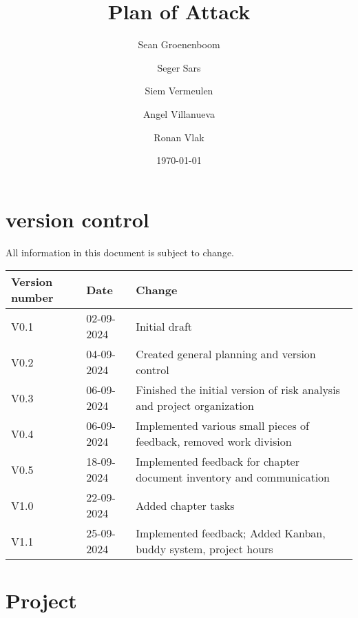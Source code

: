 \documentclass{article} %
\title{Plan of Attack} %
\author{Sean Groenenboom \and Seger Sars \and Siem Vermeulen \and Angel Villanueva \and Ronan Vlak} %
\date{\today} %
\begin{document}
\maketitle %
\newpage

\tableofcontents %
\newpage

\section{version control}
All information in this document is subject to change. \\
\begin{tabularx}{\textwidth}{|X|X|X|}
    \hline
    \textbf{Version number} & \textbf{Date} & \textbf{Change}                                                        \\ \hline
    V0.1                    & 02-09-2024    & Initial draft                                                          \\ \hline
    V0.2                    & 04-09-2024    & Created general planning and version control                           \\ \hline
    V0.3                    & 06-09-2024    & Finished the initial version of risk analysis and project organization \\ \hline
    V0.4                    & 06-09-2024    & Implemented various small pieces of feedback, removed work division    \\ \hline
    V0.5                    & 18-09-2024    & Implemented feedback for chapter document inventory and communication  \\ \hline
V1.0 & 22-09-2024 & Added chapter tasks \\ \hline
V1.1 & 25-09-2024 & Implemented feedback; Added Kanban, buddy system, project hours
\end{tabularx}
\newpage

\section{Project}
\end{document}
